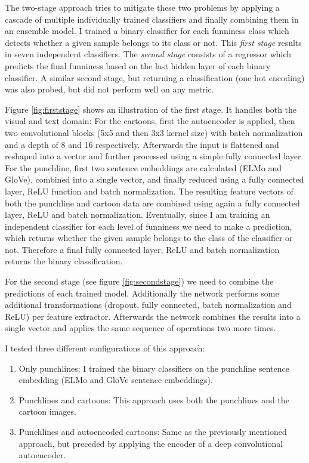 \documentclass[draft,final,oneside]{vutinfth} %
\begin{document}
The two-stage approach tries to mitigate these two problems by applying a cascade of multiple individually trained classifiers and finally combining them in an ensemble model. I trained a binary classifier for each funniness class  which detects whether a given sample belongs to its class or not. This \textit{first stage} results in seven independent classifiers. The \textit{second stage} consists of a regressor which predicts the final funniness based on the last hidden layer of each binary classifier. A similar second stage, but returning a classification (one hot encoding) was also probed, but did not perform well on any metric.

Figure \ref{fig:firststage} shows an illustration of the first stage. It handles both the visual and text domain: For the cartoons, first the autoencoder is applied, then two convolutional blocks (5x5 and then 3x3 kernel size) with batch normalization and a depth of 8 and 16 respectively. Afterwards the input is flattened and reshaped into a vector and further processed using a simple fully connected layer. For the punchline, first two sentence embeddings are calculated (ELMo and GloVe), combined into a single vector, and finally reduced using a fully connected layer, ReLU function and batch normalization. The resulting feature vectors of both the punchline and cartoon data are combined using again a fully connected layer, ReLU and batch normalization. Eventually, since I am training an independent classifier for each level of funniness we need to make a prediction, which returns whether the given sample belongs to the class of the classifier or not. Therefore a final fully connected layer, ReLU and batch normalization returns the binary classification.

For the second stage (see figure \ref{fig:secondstage}) we need to combine the predictions of each trained model. Additionally the network performs some additional transformations (dropout, fully connected, batch normalization and ReLU) per feature extractor. Afterwards the network combines the results into a single vector and applies the same sequence of operations two more times.

I tested three different configurations of this approach:

\begin{enumerate}

\item Only punchlines: I trained the binary classifiers on the punchline sentence embedding (ELMo and GloVe sentence embeddings).
\item Punchlines and cartoons: This approach uses both the punchlines and the cartoon images.
\item Punchlines and autoencoded cartoons: Same as the previously mentioned approach, but preceded by applying the encoder of a deep convolutional autoencoder.

\end{enumerate}
\end{document}
